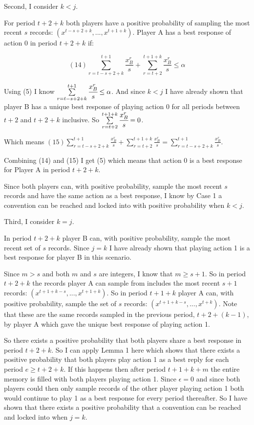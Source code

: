 \documentclass{article}
\begin{document}
\vskip18pt

Second, I consider $k<j$.

\vskip6pt

For period $t+2+k$ both players have a positive probability of sampling the most recent $s$ records: $(x^{t-s+2+k},...,x^{t+1+k})$. Player A has a best response of action 0 in period $t+2+k$ if:

$$(14) \sum\limits_{r=t-s+2+k}^{t+1}\frac{x^r_B}{s}+\sum\limits_{r=t+2}^{t+1+k} \frac{x^r_B}{s} \leq \alpha$$

Using (5) I know $\sum\limits_{r=t-s+2+k}^{t+1}\cfrac{x^r_B}{s} \leq \alpha$. And since $k<j$ I have already shown that player B has a unique best response of playing action 0 for all periods between $t+2$ and $t+2+k$ inclusive. So $\sum\limits_{r=t+2}^{t+1+k} \cfrac{x^r_B}{s}=0$.

Which means $(15) \sum\limits_{r=t-s+2+k}^{t+1}\frac{x^r_B}{s}+\sum\limits_{r=t+2}^{t+1+k} \frac{x^r_B}{s}=\sum\limits_{r=t-s+2+k}^{t+1}\frac{x^r_B}{s}$.

Combining (14) and (15) I get (5) which means that action 0 is a best response for Player A in period $t+2+k$.

\vskip6pt

Since both players can, with positive probability, sample the most recent $s$ records and have the same action as a best response, I know by Case 1 a convention can be reached and locked into with positive probability when $k<j$.

\vskip18pt

Third, I consider $k=j$.

\vskip6pt

In period $t+2+k$ player B can, with positive probability, sample the most recent set of $s$ records. Since $j=k$ I have already shown that playing action 1 is a best response for player B in this scenario.

\vskip6pt

Since $m>s$ and both $m$ and $s$ are integers, I know that $m \geq s+1$. So in period $t+2+k$ the records player A can sample from includes the most recent $s+1$ records: $(x^{t+1+k-s},...,x^{t+1+k})$. So in period $t+1+k$ player A can, with positive probability, sample the set of $s$ records: $(x^{t+1+k-s},...,x^{t+k})$. Note that these are the same records sampled in the previous period, $t+2+(k-1)$, by player A which gave the unique best response of playing action 1.

\vskip6pt

So there exists a positive probability that both players share a best response in period $t+2+k$. So I can apply Lemma 1 here which shows that there exists a positive probability that both players play action 1 as a best reply for each period $e \geq t+2+k$. If this happens then after period $t+1+k+m$ the entire memory is filled with both players playing action 1. Since $\epsilon=0$ and since both players could then only sample records of the other player playing action 1 both would continue to play 1 as a best response for every period thereafter. So I have shown that there exists a positive probability that a convention can be reached and locked into when $j=k$. 
\end{document}
